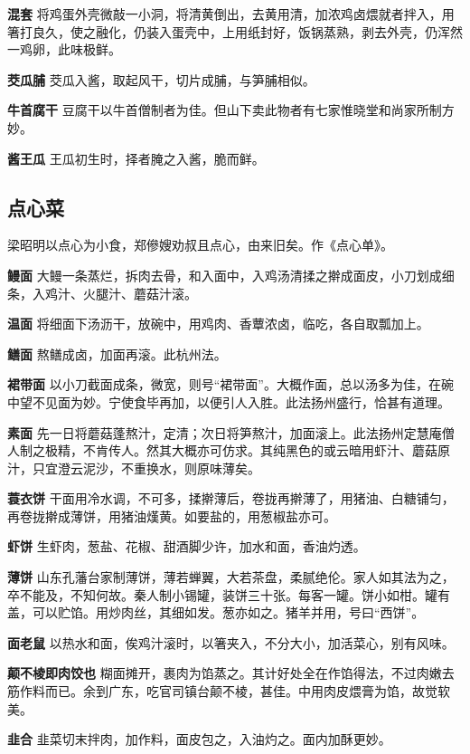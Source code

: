 \documentclass[]{article}
\begin{document}
\textbf{混套}
将鸡蛋外壳微敲一小洞，将清黄倒出，去黄用清，加浓鸡卤煨就者拌入，用箸打良久，使之融化，仍装入蛋壳中，上用纸封好，饭锅蒸熟，剥去外壳，仍浑然一鸡卵，此味极鲜。

\textbf{茭瓜脯} 茭瓜入酱，取起风干，切片成脯，与笋脯相似。

\textbf{牛首腐干}
豆腐干以牛首僧制者为佳。但山下卖此物者有七家惟晓堂和尚家所制方妙。

\textbf{酱王瓜} 王瓜初生时，择者腌之入酱，脆而鲜。

\hypertarget{header-n31}{%
\subsection{点心菜}\label{header-n31}}

梁昭明以点心为小食，郑傪嫂劝叔且点心，由来旧矣。作《点心单》。

\textbf{鳗面}
大鳗一条蒸烂，拆肉去骨，和入面中，入鸡汤清揉之擀成面皮，小刀划成细条，入鸡汁、火腿汁、蘑菇汁滚。

\textbf{温面}
将细面下汤沥干，放碗中，用鸡肉、香蕈浓卤，临吃，各自取瓢加上。

\textbf{鳝面} 熬鳝成卤，加面再滚。此杭州法。

\textbf{裙带面}
以小刀截面成条，微宽，则号``裙带面''。大概作面，总以汤多为佳，在碗中望不见面为妙。宁使食毕再加，以便引人入胜。此法扬州盛行，恰甚有道理。

\textbf{素面}
先一日将蘑菇蓬熬汁，定清；次日将笋熬汁，加面滚上。此法扬州定慧庵僧人制之极精，不肯传人。然其大概亦可仿求。其纯黑色的或云暗用虾汁、蘑菇原汁，只宜澄云泥沙，不重换水，则原味薄矣。

\textbf{蓑衣饼}
干面用冷水调，不可多，揉擀薄后，卷拢再擀薄了，用猪油、白糖铺匀，再卷拢擀成薄饼，用猪油熯黄。如要盐的，用葱椒盐亦可。

\textbf{虾饼} 生虾肉，葱盐、花椒、甜酒脚少许，加水和面，香油灼透。

\textbf{薄饼}
山东孔藩台家制薄饼，薄若蝉翼，大若茶盘，柔腻绝伦。家人如其法为之，卒不能及，不知何故。秦人制小锡罐，装饼三十张。每客一罐。饼小如柑。罐有盖，可以贮馅。用炒肉丝，其细如发。葱亦如之。猪羊并用，号曰``西饼''。

\textbf{面老鼠}
以热水和面，俟鸡汁滚时，以箸夹入，不分大小，加活菜心，别有风味。

\textbf{颠不棱即肉饺也}
糊面摊开，裹肉为馅蒸之。其计好处全在作馅得法，不过肉嫩去筋作料而已。余到广东，吃官司镇台颠不棱，甚佳。中用肉皮煨膏为馅，故觉软美。

\textbf{韭合} 韭菜切末拌肉，加作料，面皮包之，入油灼之。面内加酥更妙。
\end{document}
